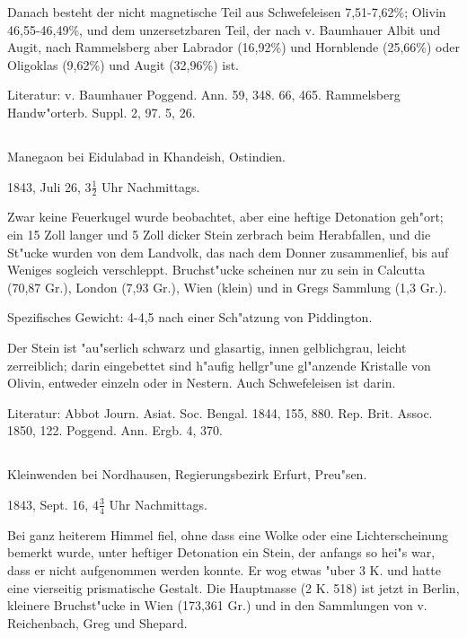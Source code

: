 \documentclass[a4paper, 11pt, oneside]{article}
\begin{document}
Danach besteht der nicht magnetische Teil aus Schwefeleisen 7,51-7,62\%; Olivin 46,55-46,49\%, und dem unzersetzbaren Teil, der nach v. Baumhauer Albit und Augit, nach Rammelsberg aber Labrador (16,92\%) und Hornblende (25,66\%) oder Oligoklas (9,62\%) und Augit (32,96\%) ist.

\normalsize
Literatur: v. Baumhauer Poggend. Ann. 59, 348. 66, 465. Rammelsberg Handw"orterb. Suppl. 2, 97. 5, 26.

\subsection{}
\LARGE
\paragraph{}
Manegaon bei Eidulabad in Khandeish, Ostindien.

1843, Juli 26, $\mathfrak{3\frac{1}{2}}$ Uhr Nachmittags.

Zwar keine Feuerkugel wurde beobachtet, aber eine heftige Detonation geh"ort; ein 15 Zoll langer und 5 Zoll dicker Stein zerbrach beim Herabfallen, und die St"ucke wurden von dem Landvolk, das nach dem Donner zusammenlief, bis auf Weniges sogleich verschleppt. Bruchst"ucke scheinen nur zu sein in Calcutta (70,87 Gr.), London (7,93 Gr.), Wien (klein) und in Gregs Sammlung (1,3 Gr.).

Spezifisches Gewicht: 4-4,5 nach einer Sch"atzung von Piddington.

Der Stein ist "au"serlich schwarz und glasartig, innen gelblichgrau, leicht zerreiblich; darin eingebettet sind h"aufig hellgr"une gl"anzende Kristalle von Olivin, entweder einzeln oder in Nestern. Auch Schwefeleisen ist darin.

\normalsize
Literatur: Abbot Journ. Asiat. Soc. Bengal. 1844, 155, 880. Rep. Brit. Assoc. 1850, 122. Poggend. Ann. Ergb. 4, 370.

\subsection{}
\LARGE
\paragraph{}
Kleinwenden bei Nordhausen, Regierungsbezirk Erfurt, Preu"sen.

1843, Sept. 16, $\mathfrak{4\frac{3}{4}}$ Uhr Nachmittags.

Bei ganz heiterem Himmel fiel, ohne dass eine Wolke oder eine Lichterscheinung bemerkt wurde, unter heftiger Detonation ein Stein, der anfangs so hei"s war, dass er nicht aufgenommen werden konnte. Er wog etwas "uber 3 K. und hatte eine vierseitig prismatische Gestalt. Die Hauptmasse (2 K. 518) ist jetzt in Berlin, kleinere Bruchst"ucke in Wien (173,361 Gr.) und in den Sammlungen von v. Reichenbach, Greg und Shepard.
\end{document}
